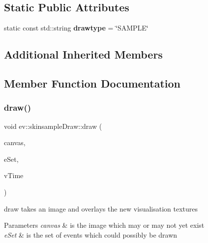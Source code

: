 \subsection*{Static Public Attributes}
\begin{DoxyCompactItemize}
\item 
\mbox{\label{classev_1_1skinsampleDraw_a1519aa476ab6326a0c509b6100c2df5c}} 
static const std\+::string {\bfseries drawtype} = \char`\"{}S\+A\+M\+P\+LE\char`\"{}
\end{DoxyCompactItemize}
\subsection*{Additional Inherited Members}


\subsection{Member Function Documentation}
\mbox{\label{classev_1_1skinsampleDraw_a1c2492038e7fe94fe88d2286ac18f2c6}} 
\subsubsection{\texorpdfstring{draw()}{draw()}}
{\footnotesize\ttfamily void ev\+::skinsample\+Draw\+::draw (\begin{DoxyParamCaption}\item[{cv\+::\+Mat \&}]{canvas,  }\item[{const ev\+::v\+Queue \&}]{e\+Set,  }\item[{int}]{v\+Time }\end{DoxyParamCaption})\hspace{0.3cm}{\ttfamily [virtual]}}



draw takes an image and overlays the new visualisation textures 


\begin{DoxyParams}{Parameters}
{\em canvas} & is the image which may or may not yet exist \\
\hline
{\em e\+Set} & is the set of events which could possibly be drawn \\
\hline
\end{DoxyParams}


